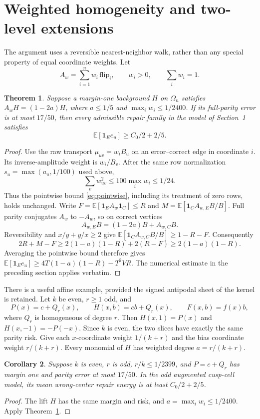 \documentclass[11pt]{article}
\newtheorem{theorem}{Theorem}
\newtheorem{corollary}[theorem]{Corollary}
\newcommand{\E}{\mathbb E}
\newcommand{\1}{\mathbf 1}
\begin{document}
\section{Weighted homogeneity and two-level extensions}
The argument uses a reversible nearest-neighbor walk, rather than any
special property of equal coordinate weights. Let
\[
 A_w=\sum_{i=1}^n w_i\,\mathrm{flip}_i,
 \qquad w_i>0,\qquad\sum_iw_i=1.
\]
\begin{theorem}\label{thm:weighted}
Suppose a margin-one background $H$ on $\Omega_n$ satisfies
$A_wH=(1-2a)H$, where $a\le1/5$ and
$\max_iw_i\le1/2400$. If its full-parity error is at most $17/50$,
then every admissible repair family in the model of Section~1 satisfies
\[
 \E[\1_Ee_u]\ge C_0/2+2/5.
\]
\end{theorem}
\begin{proof}
Use the raw transport $\mu_{uv}=w_iB_u$ on an error--correct edge in
coordinate $i$. Its inverse-amplitude weight is $w_i/B_v$.
After the same row normalization $s_u=\max(a_u,1/100)$ used above,
\[
 \sum_vw_{uv}^2\le100\max_iw_i\le1/24.
\]
Thus the pointwise bound \eqref{eq:pointwise}, including its treatment
of zero rows, holds unchanged. Write
$F=\E[\1_E A_w\1_C]\le R$ and
$M=\E[\1_C A_{w,E}B/B]$. Full parity conjugates $A_w$ to $-A_w$,
so on correct vertices
\[
 A_{w,E}B=(1-2a)B+A_{w,C}B.
\]
Reversibility and $x/y+y/x\ge2$ give
$\E[\1_C A_{w,C}B/B]\ge1-R-F$. Consequently
\[
 2R+M-F\ge2(1-a)(1-R)+2(R-F)\ge2(1-a)(1-R).
\]
Averaging the pointwise bound therefore gives
$\E[\1_Ee_u]\ge4T(1-a)(1-R)-T^2VR$.
The numerical estimate in the preceding section applies verbatim.
\end{proof}

There is a useful affine example, provided the signed antipodal sheet
of the kernel is retained. Let $k$ be even, $r\ge1$ odd, and
\[
 P(x)=c+Q_r(x),\qquad H(x,b)=cb+Q_r(x),
 \qquad F(x,b)=f(x)b,
\]
where $Q_r$ is homogeneous of degree $r$. Then
$H(x,1)=P(x)$ and $H(x,-1)=-P(-x)$. Since $k$ is even, the two slices
have exactly the same parity risk. Give each $x$-coordinate weight
$1/(k+r)$ and the bias coordinate weight $r/(k+r)$. Every monomial
of $H$ has weighted degree $a=r/(k+r)$.

\begin{corollary}\label{cor:affine}
Suppose $k$ is even, $r$ is odd, $r/k\le1/2399$, and
$P=c+Q_r$ has margin one and parity error at most $17/50$.
In the odd augmented cusp-cell model, its mean wrong-center repair
energy is at least $C_0/2+2/5$.
\end{corollary}
\begin{proof}
The lift $H$ has the same margin and risk, and
$a=\max_iw_i\le1/2400$. Apply Theorem~\ref{thm:weighted}.
\end{proof}
\end{document}
